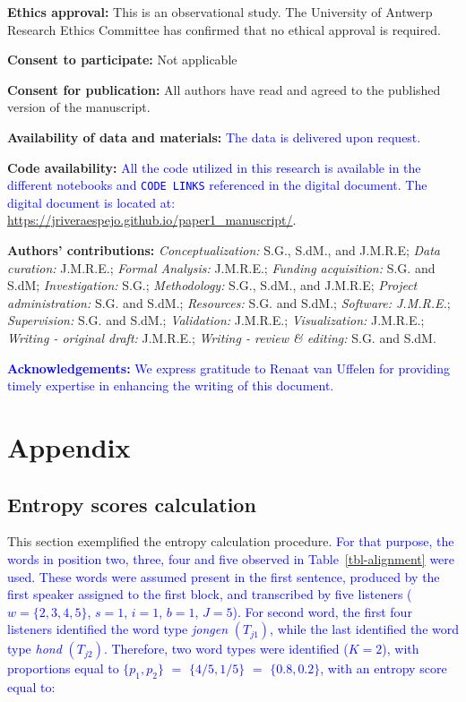 \documentclass[
  authoryear,
  preprint,
  1p]{elsarticle}
\begin{document}
\textbf{Ethics approval:} This is an observational study. The University
of Antwerp Research Ethics Committee has confirmed that no ethical
approval is required.

\textbf{Consent to participate:} Not applicable

\textbf{Consent for publication:} All authors have read and agreed to
the published version of the manuscript.

\textbf{Availability of data and materials:} \textcolor{blue}{The data is delivered upon
request.}

\textbf{Code availability:} \textcolor{blue}{All the code utilized in this research is
available in the different notebooks and \texttt{CODE\ LINKS} referenced
in the digital document. The digital document is located at:}
\url{https://jriveraespejo.github.io/paper1_manuscript/}.

\textbf{Authors' contributions:} \emph{Conceptualization:} S.G., S.dM.,
and J.M.R.E; \emph{Data curation:} J.M.R.E.; \emph{Formal Analysis:}
J.M.R.E.; \emph{Funding acquisition:} S.G. and S.dM;
\emph{Investigation:} S.G.; \emph{Methodology:} S.G., S.dM., and
J.M.R.E; \emph{Project administration:} S.G. and S.dM.;
\emph{Resources:} S.G. and S.dM.; \emph{Software: J.M.R.E.};
\emph{Supervision:} S.G. and S.dM.; \emph{Validation:} J.M.R.E.;
\emph{Visualization:} J.M.R.E.; \emph{Writing - original draft:}
J.M.R.E.; \emph{Writing - review \& editing:} S.G. and S.dM.

\textcolor{blue}{\textbf{Acknowledgements:} We express gratitude to Renaat van Uffelen
for providing timely expertise in enhancing the writing of this
document.}

\newpage{}

\section{Appendix}\label{sec-appendix}

\subsection{Entropy scores calculation}\label{sec-appA}

This section exemplified the entropy calculation procedure. \textcolor{blue}{For that
purpose, the words in position two, three, four and five observed in
Table~\ref{tbl-alignment} were used. These words were assumed present in
the first sentence, produced by the first speaker assigned to the first
block, and transcribed by five listeners (\(w=\{2,3,4,5\}\), \(s=1\),
\(i=1\), \(b=1\), \(J=5\)). For second word, the first four listeners
identified the word type \emph{jongen} \((T_{j1})\), while the last
identified the word type \emph{hond} \((T_{j2})\). Therefore, two word
types were identified (\(K=2\)), with proportions equal to
\(\{ p_{1}, p_{2} \}\) \(=\) \(\{ 4/5, 1/5 \}\) \(=\)
\(\{ 0.8, 0.2 \}\), with an entropy score equal to:}
\end{document}
